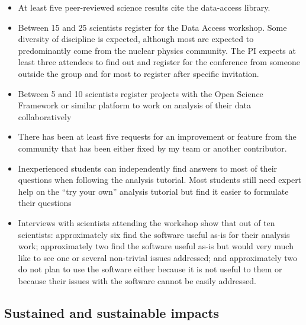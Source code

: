 \begin{itemize}
  \item At least five peer-reviewed science results cite the data-access library.
  \item Between 15 and 25 scientists register for the Data Access workshop.  Some diversity of discipline is expected, although most are expected to predominantly come from the nuclear physics community.  The PI expects at least three attendees to find out and register for the conference from someone outside the group and for most to register after specific invitation.
  \item Between 5 and 10 scientists register projects with the Open Science Framework or similar platform to work on analysis of their data collaboratively
  \item There has been at least five requests for an improvement or feature from the community that has been either fixed by my team or another contributor.
  \item Inexperienced students can independently find answers to most of their questions when following the analysis tutorial.  Most students still need expert help on the ``try your own'' analysis tutorial but find it easier to formulate their questions
  \item Interviews with scientists attending the workshop show that out of ten scientists: approximately six find the software useful as-is for their analysis work; approximately two find the software useful as-is but would very much like to see one or several non-trivial issues addressed; and approximately two do not plan to use the software either because it is not useful to them or because their issues with the software cannot be easily addressed.
\end{itemize}


\subsection{Sustained and sustainable impacts}

